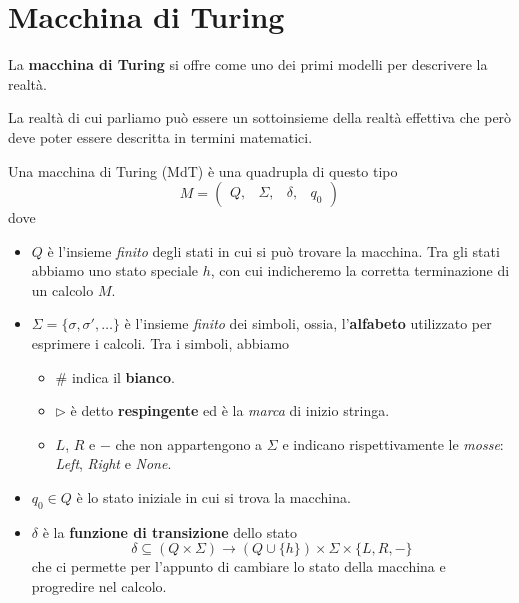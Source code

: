 \section{Macchina di Turing}
La \textbf{macchina di Turing} si offre come uno dei primi
modelli per descrivere la realtà.

La realtà di cui parliamo può essere un sottoinsieme della
realtà effettiva che però deve poter essere descritta in
termini matematici.

\begin{definition}
	Una macchina di Turing (MdT) è una
	quadrupla di questo tipo
	\[
		M = \begin{pmatrix}
			Q, & \Sigma, & \delta, & q_0
		\end{pmatrix}
	\]
	dove
	\begin{itemize}
		\item $Q$ è l'insieme \emph{finito} degli stati in
		      cui si può trovare la macchina. Tra gli stati
		      abbiamo uno stato speciale $h$, con cui
		      indicheremo la corretta terminazione di un
		      calcolo $M$.
		\item $\Sigma = \{ \sigma, \sigma', \dots \}$ è
		      l'insieme \emph{finito} dei simboli, ossia,
		      l'\textbf{alfabeto} utilizzato per esprimere
		      i calcoli. Tra i simboli, abbiamo
		      \begin{itemize}
			      \item $\#$ indica il \textbf{bianco}.
			      \item $\triangleright$ è detto
			            \textbf{respingente} ed è la
			            \emph{marca} di inizio stringa.
			      \item $L$, $R$ e $-$ che non appartengono a
			            $\Sigma$ e indicano rispettivamente
			            le \emph{mosse}: \emph{Left},
			            \emph{Right} e \emph{None}.
		      \end{itemize}
		\item $q_0 \in Q$ è lo stato iniziale in cui si
		      trova la macchina.
		\item $\delta$ è la \textbf{funzione di transizione}
		      dello stato
		      \[
			      \delta \subseteq (Q \times \Sigma) \to
			      (Q \cup \{ h \}) \times \Sigma \times
			      \{ L, R, - \}
		      \]
		      che ci permette per l'appunto di cambiare lo
		      stato della macchina e progredire nel calcolo.
	\end{itemize}
\end{definition}

